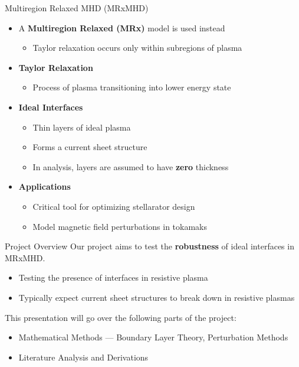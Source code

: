 \documentclass[compress]{beamer}
\newcounter{Segment}
\newcommand{\finishSegment}{\label{endSegment\theSegment}}
\begin{document}

\begin{frame}{Multiregion Relaxed MHD (MRxMHD)}
    \begin{itemize}
        \item A {\bf Multiregion Relaxed (MRx)} model is used instead
            \begin{itemize}
                \item Taylor relaxation occurs only within subregions of plasma \cite{dewar2017}
            \end{itemize}
        \item {\bf Taylor Relaxation}
            \begin{itemize}
                \item Process of plasma transitioning into lower energy state
            \end{itemize}
        \item {\bf Ideal Interfaces}
            \begin{itemize}
                \item Thin layers of ideal plasma
                \item Forms a current sheet structure
                \item In analysis, layers are assumed to have {\bf zero} thickness
            \end{itemize}
        \item {\bf Applications}
            \begin{itemize}
                \item Critical tool for optimizing stellarator design
                \item Model magnetic field perturbations in tokamaks
            \end{itemize}
    \end{itemize}

\end{frame}

\begin{frame}{Project Overview}
    Our project aims to test the {\bf robustness} of ideal interfaces in MRxMHD.
    \begin{itemize}
        \item Testing the presence of interfaces in resistive plasma
        \item Typically expect current sheet structures to break down in resistive plasmas
    \end{itemize}
    
    This presentation will go over the following parts of the project:
    \begin{itemize}
        \item Mathematical Methods --- Boundary Layer Theory, Perturbation Methods %
        \item Literature Analysis and Derivations
    \end{itemize}
    \finishSegment
\end{frame}
\end{document}
